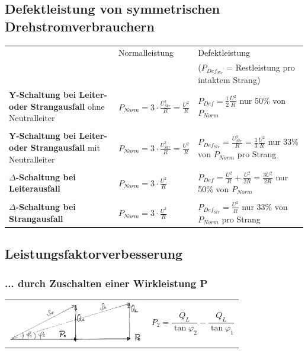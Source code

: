 	\subsection{Defektleistung von symmetrischen Drehstromverbrauchern}
		\begin{tabular}{| p{7.5cm} | l | l |}
			\hline
 				& Normalleistung		& Defektleistung \\
 				&&($P_{Def_{Str}}$ = Restleistung pro intaktem Strang) \\
 			\hline
	 			\textbf{Y-Schaltung bei Leiter- oder Strangausfall} ohne Neutralleiter &
	 				$P_{Norm} = 3 \cdot \frac{U^2_{Str}}{R} = \frac{U^2}{R}$ &
	 				$P_{Def} = \frac{1}{2} \frac{U^2}{R}$ \tiny{nur 50\% von $P_{Norm}$} \\
	 			&&\\
	 			\textbf{Y-Schaltung bei Leiter- oder Strangausfall} mit Neutralleiter &
	 				$P_{Norm} = 3 \cdot \frac{U^2_{Str}}{R} = \frac{U^2}{R}$ &
	 				$P_{Def_{Str}} = \frac{U^2_{Str}}{R} = \frac{1}{3} \frac{U^2}{R}$ \tiny{nur 33\% von
	 				$P_{Norm}$ pro Strang} \\ &&\\
	 			\textbf{$\Delta$-Schaltung bei Leiterausfall} &
	 				$P_{Norm} = 3 \cdot \frac{U^2}{R}$ &
	 				$P_{Def} = \frac{U^2}{R} + \frac{U^2}{2R} = \frac{3U^2}{2R}$ \tiny{nur 50\% von $P_{Norm}$} \\
	 			&&\\
	 			\textbf{$\Delta$-Schaltung bei Strangausfall} &
	 				$P_{Norm} = 3 \cdot \frac{U^2}{R}$ &
	 				$P_{Def_{Str}} = \frac{U^2}{R}$ \tiny{nur 33\% von $P_{Norm}$ pro Strang} \\
	 		\hline
		 \end{tabular} 
		 
	\subsection{Leistungsfaktorverbesserung}
		\subsubsection{... durch Zuschalten einer Wirkleistung P}
			\begin{tabular}{m{6cm} m{6cm}}
				\includegraphics[width=6cm]{bilder/Leistungsfaktorverbesserung_Zuschalten_Wirkleitsung.png}&
				$P_2 = \dfrac{Q_L}{\tan \varphi_2} - \dfrac{Q_L}{\tan \varphi_1}$
			\end{tabular}
		
